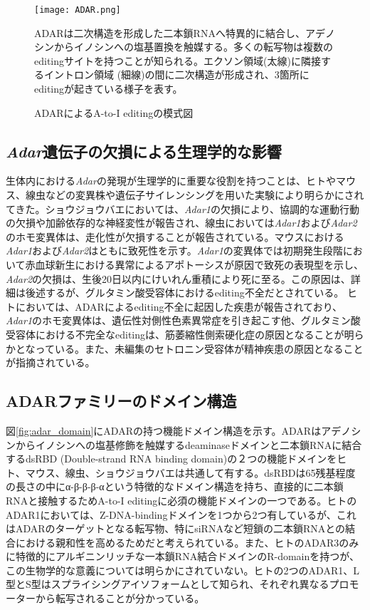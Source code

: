 \begin{figure}[!htbp]
	\begin{center}
		\texttt{[image: ADAR.png]}
	\end{center}
	\caption{ADARによるA-to-I editingの模式図}
	\begin{flushleft}
		\small{ADARは二次構造を形成した二本鎖RNAへ特異的に結合し、アデノシンからイノシンへの塩基置換を触媒する。多くの転写物は複数のeditingサイトを持つことが知られる。エクソン領域(太線)に隣接するイントロン領域 (細線)の間に二次構造が形成され、3箇所にeditingが起きている様子を表す。}
	\end{flushleft}
	\label{fig:ADAR}
\end{figure}

\subsection{\textit{Adar}遺伝子の欠損による生理学的な影響}
生体内における\textit{Adar}の発現が生理学的に重要な役割を持つことは、ヒトやマウス、線虫などの変異株や遺伝子サイレンシングを用いた実験により明らかにされてきた。ショウジョウバエにおいては、\textit{Adar1}の欠損により、協調的な運動行動の欠損や加齢依存的な神経変性が報告され、線虫においては\textit{Adar1}および\textit{Adar2}のホモ変異体は、走化性が欠損することが報告されている。マウスにおける\textit{Adar1}および\textit{Adar2}はともに致死性を示す。\textit{Adar1}の変異体では初期発生段階において赤血球新生における異常によるアポトーシスが原因で致死の表現型を示し、\textit{Adar2}の欠損は、生後20日以内にけいれん重積により死に至る。この原因は、詳細は後述するが、グルタミン酸受容体におけるediting不全だとされている。
ヒトにおいては、ADARによるediting不全に起因した疾患が報告されており、\textit{Adar1}のホモ変異体は、遺伝性対側性色素異常症を引き起こす他、グルタミン酸受容体における不完全なeditingは、筋萎縮性側索硬化症の原因となることが明らかとなっている。また、未編集のセトロニン受容体が精神疾患の原因となることが指摘されている。

\subsection{ADARファミリーのドメイン構造}
図\ref{fig:adar_domain}にADARの持つ機能ドメイン構造を示す。ADARはアデノシンからイノシンへの塩基修飾を触媒するdeaminaseドメインと二本鎖RNAに結合するdsRBD (Double-strand RNA binding domain)の２つの機能ドメインをヒト、マウス、線虫、ショウジョウバエは共通して有する。dsRBDは65残基程度の長さの中にα-β-β-β-αという特徴的なドメイン構造を持ち、直接的に二本鎖RNAと接触するためA-to-I editingに必須の機能ドメインの一つである。ヒトのADAR1においては、Z-DNA-bindingドメインを1つから2つ有しているが、これはADARのターゲットとなる転写物、特にsiRNAなど短鎖の二本鎖RNAとの結合における親和性を高めるためだと考えられている。また、ヒトのADAR3のみに特徴的にアルギニンリッチな一本鎖RNA結合ドメインのR-domainを持つが、この生物学的な意義については明らかにされていない。ヒトの2つのADAR1、L型とS型はスプライシングアイソフォームとして知られ、それぞれ異なるプロモーターから転写されることが分かっている。

